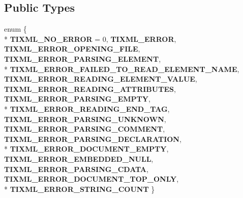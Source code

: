 \subsection*{Public Types}
\begin{DoxyCompactItemize}
\item 
enum \{ \\*
{\bfseries T\+I\+X\+M\+L\+\_\+\+N\+O\+\_\+\+E\+R\+R\+OR} = 0, 
{\bfseries T\+I\+X\+M\+L\+\_\+\+E\+R\+R\+OR}, 
{\bfseries T\+I\+X\+M\+L\+\_\+\+E\+R\+R\+O\+R\+\_\+\+O\+P\+E\+N\+I\+N\+G\+\_\+\+F\+I\+LE}, 
{\bfseries T\+I\+X\+M\+L\+\_\+\+E\+R\+R\+O\+R\+\_\+\+P\+A\+R\+S\+I\+N\+G\+\_\+\+E\+L\+E\+M\+E\+NT}, 
\\*
{\bfseries T\+I\+X\+M\+L\+\_\+\+E\+R\+R\+O\+R\+\_\+\+F\+A\+I\+L\+E\+D\+\_\+\+T\+O\+\_\+\+R\+E\+A\+D\+\_\+\+E\+L\+E\+M\+E\+N\+T\+\_\+\+N\+A\+ME}, 
{\bfseries T\+I\+X\+M\+L\+\_\+\+E\+R\+R\+O\+R\+\_\+\+R\+E\+A\+D\+I\+N\+G\+\_\+\+E\+L\+E\+M\+E\+N\+T\+\_\+\+V\+A\+L\+UE}, 
{\bfseries T\+I\+X\+M\+L\+\_\+\+E\+R\+R\+O\+R\+\_\+\+R\+E\+A\+D\+I\+N\+G\+\_\+\+A\+T\+T\+R\+I\+B\+U\+T\+ES}, 
{\bfseries T\+I\+X\+M\+L\+\_\+\+E\+R\+R\+O\+R\+\_\+\+P\+A\+R\+S\+I\+N\+G\+\_\+\+E\+M\+P\+TY}, 
\\*
{\bfseries T\+I\+X\+M\+L\+\_\+\+E\+R\+R\+O\+R\+\_\+\+R\+E\+A\+D\+I\+N\+G\+\_\+\+E\+N\+D\+\_\+\+T\+AG}, 
{\bfseries T\+I\+X\+M\+L\+\_\+\+E\+R\+R\+O\+R\+\_\+\+P\+A\+R\+S\+I\+N\+G\+\_\+\+U\+N\+K\+N\+O\+WN}, 
{\bfseries T\+I\+X\+M\+L\+\_\+\+E\+R\+R\+O\+R\+\_\+\+P\+A\+R\+S\+I\+N\+G\+\_\+\+C\+O\+M\+M\+E\+NT}, 
{\bfseries T\+I\+X\+M\+L\+\_\+\+E\+R\+R\+O\+R\+\_\+\+P\+A\+R\+S\+I\+N\+G\+\_\+\+D\+E\+C\+L\+A\+R\+A\+T\+I\+ON}, 
\\*
{\bfseries T\+I\+X\+M\+L\+\_\+\+E\+R\+R\+O\+R\+\_\+\+D\+O\+C\+U\+M\+E\+N\+T\+\_\+\+E\+M\+P\+TY}, 
{\bfseries T\+I\+X\+M\+L\+\_\+\+E\+R\+R\+O\+R\+\_\+\+E\+M\+B\+E\+D\+D\+E\+D\+\_\+\+N\+U\+LL}, 
{\bfseries T\+I\+X\+M\+L\+\_\+\+E\+R\+R\+O\+R\+\_\+\+P\+A\+R\+S\+I\+N\+G\+\_\+\+C\+D\+A\+TA}, 
{\bfseries T\+I\+X\+M\+L\+\_\+\+E\+R\+R\+O\+R\+\_\+\+D\+O\+C\+U\+M\+E\+N\+T\+\_\+\+T\+O\+P\+\_\+\+O\+N\+LY}, 
\\*
{\bfseries T\+I\+X\+M\+L\+\_\+\+E\+R\+R\+O\+R\+\_\+\+S\+T\+R\+I\+N\+G\+\_\+\+C\+O\+U\+NT}
 \}\hypertarget{classTiXmlBase_a9a7e9344415956ab96e8c75f6a0bbd48}{}\label{classTiXmlBase_a9a7e9344415956ab96e8c75f6a0bbd48}

\end{DoxyCompactItemize}
